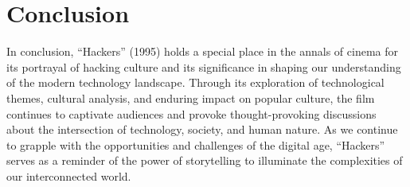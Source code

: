 \documentclass[
  openany]{book}
\begin{document}
\hypertarget{conclusion}{%
\chapter{Conclusion}\label{conclusion}}

In conclusion, ``Hackers'' (1995) holds a special place in the annals of cinema for its portrayal of hacking culture and its significance in shaping our understanding of the modern technology landscape. Through its exploration of technological themes, cultural analysis, and enduring impact on popular culture, the film continues to captivate audiences and provoke thought-provoking discussions about the intersection of technology, society, and human nature. As we continue to grapple with the opportunities and challenges of the digital age, ``Hackers'' serves as a reminder of the power of storytelling to illuminate the complexities of our interconnected world.
\end{document}
